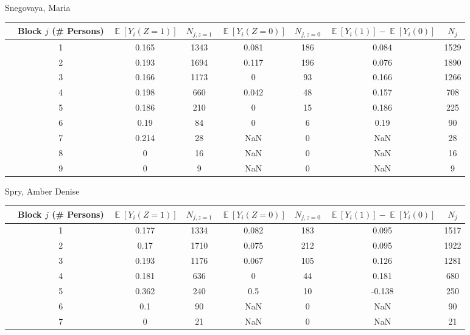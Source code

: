 \documentclass[11pt,notitlepage]{article}
\def\E{\mathop{\mathbb{E}}}
\begin{document}
Snegovaya, Maria


\begin{table}[h!]\small
\begin{center}
\begin{tabular}{rc|cc|cc|cc}
  \hline
 & Block $j$ (\# Persons) & $\E[Y_i(Z=1)]$ & $N_{j, z=1}$ & $\E[Y_i(Z=0)]$ & $N_{j, z=0}$ & $\E[Y_i(1)]-\E[Y_i(0)]$ & $N_j$ \\ 
  \hline
 & 1 & 0.165 & 1343 & 0.081 & 186 & 0.084 & 1529 \\ 
  & 2 & 0.193 & 1694 & 0.117 & 196 & 0.076 & 1890 \\ 
  & 3 & 0.166 & 1173 & 0 & 93 & 0.166 & 1266 \\ 
  & 4 & 0.198 & 660 & 0.042 & 48 & 0.157 & 708 \\ 
  & 5 & 0.186 & 210 & 0 & 15 & 0.186 & 225 \\ 
  & 6 & 0.19 & 84 & 0 & 6 & 0.19 & 90 \\ 
  & 7 & 0.214 & 28 & NaN & 0 & NaN & 28 \\ 
  & 8 & 0 & 16 & NaN & 0 & NaN & 16 \\ 
  & 9 & 0 & 9 & NaN & 0 & NaN & 9 \\ 
   \hline
\end{tabular}
\end{center}
\end{table}

\clearpage


Spry, Amber Denise


\begin{table}[h!]\small
\begin{center}
\begin{tabular}{rc|cc|cc|cc}
  \hline
 & Block $j$ (\# Persons) & $\E[Y_i(Z=1)]$ & $N_{j, z=1}$ & $\E[Y_i(Z=0)]$ & $N_{j, z=0}$ & $\E[Y_i(1)]-\E[Y_i(0)]$ & $N_j$ \\ 
  \hline
 & 1 & 0.177 & 1334 & 0.082 & 183 & 0.095 & 1517 \\ 
 & 2 & 0.17 & 1710 & 0.075 & 212 & 0.095 & 1922 \\ 
 & 3 & 0.193 & 1176 & 0.067 & 105 & 0.126 & 1281 \\ 
 & 4 & 0.181 & 636 & 0 & 44 & 0.181 & 680 \\ 
 & 5 & 0.362 & 240 & 0.5 & 10 & -0.138 & 250 \\ 
 & 6 & 0.1 & 90 & NaN & 0 & NaN & 90 \\ 
 & 7 & 0 & 21 & NaN & 0 & NaN & 21 \\ 
   \hline
\end{tabular}
\end{center}
\end{table}
\end{document}
